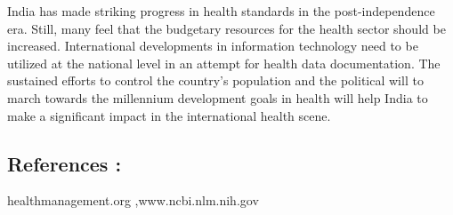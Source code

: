 \documentclass[11pt]{article}
\begin{document}
India has made striking progress in health standards in the post-independence era. Still, many feel that the budgetary resources for the health sector should be increased. International developments in information technology need to be utilized at the national level in an attempt for health data documentation. The sustained efforts to control the country’s population and the political will to march towards the millennium development goals in health will help India to make a significant impact in the international health scene.
  
  
  
\subsection{References :}  \Large healthmanagement.org ,www.ncbi.nlm.nih.gov

 
\end{document}
